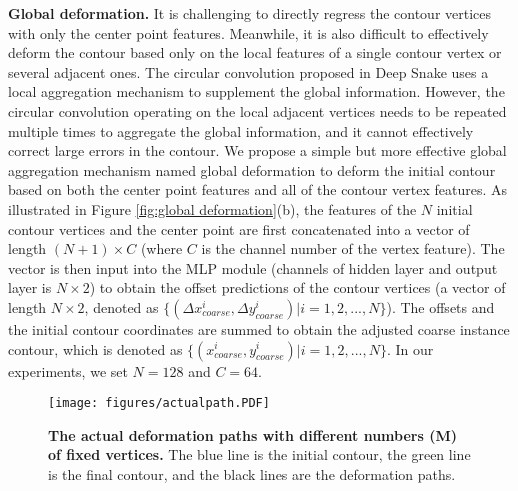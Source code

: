\documentclass[10pt,twocolumn,letterpaper]{article}
\begin{document}
\textbf{Global deformation.} It is challenging to directly regress the contour vertices with only the center point features. Meanwhile, it is also difficult to effectively deform the contour based only on the local features of a single contour vertex or several adjacent ones. The circular convolution proposed in Deep Snake uses a local aggregation mechanism to supplement the global information. However, the circular convolution operating on the local adjacent vertices needs to be repeated multiple times to aggregate the global information, and it cannot effectively correct large errors in the contour. We propose a simple but more effective global aggregation mechanism named global deformation to deform the initial contour based on both the center point features and all of the contour vertex features. As illustrated in Figure \ref{fig:global deformation}(b), the features of the $N$ initial contour vertices and the center point are first concatenated into a vector of length $(N+1)\times C$ (where $C$ is the channel number of the vertex feature). The vector is then input into the MLP module (channels of hidden layer and output layer is $N\times 2$) to obtain the offset predictions of the contour vertices (a vector of length $N\times 2$, denoted as $\{(\Delta x_{coarse}^{i},\Delta y_{coarse}^{i})|i=1,2,...,N\}$). The offsets and the initial contour coordinates are summed to obtain the adjusted coarse instance contour, which is denoted as $\{(x_{coarse}^{i},y_{coarse}^{i})|i=1,2,...,N\}$. In our experiments, we set $N=128$ and $C=64$.
\begin{figure}[t]
  \centering
   \texttt{[image: figures/actualpath.PDF]}\vspace{-3mm}
   \caption{\textbf{The actual deformation paths with different numbers (M) of fixed vertices.} The blue line is the initial contour, the green line is the final contour, and the black lines are the deformation paths.}
   \label{fig:actual deform path}
   \vspace{-5mm}
\end{figure}
\end{document}
